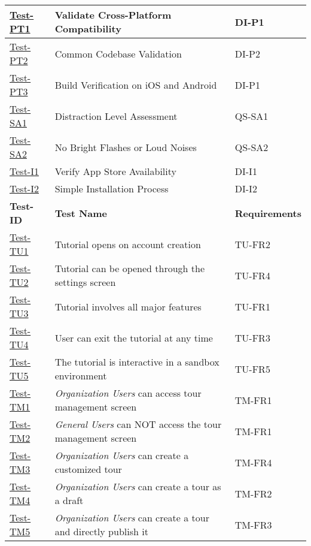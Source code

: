 \documentclass[12pt, titlepage]{article}
\begin{document}
\begin{table}[h!]
\begin{tabular}{|l|l|l|}
        \hline
        \hyperref[itm:Test-PT1]{Test-PT1} & Validate Cross-Platform Compatibility & DI-P1 \\
        \hline
        \hyperref[itm:Test-PT2]{Test-PT2} & Common Codebase Validation & DI-P2 \\
        \hline
        \hyperref[itm:Test-PT3]{Test-PT3} & Build Verification on iOS and Android & DI-P1\\
        \hline
        \hyperref[itm:Test-SA1]{Test-SA1} & Distraction Level Assessment & QS-SA1 \\
        \hline
        \hyperref[itm:Test-SA2]{Test-SA2} & No Bright Flashes or Loud Noises & QS-SA2 \\
        \hline
        \hyperref[itm:Test-I1]{Test-I1} & Verify App Store Availability & DI-I1 \\
        \hline
        \hyperref[itm:Test-I2]{Test-I2} & Simple Installation Process & DI-I2 \\
        \hline
        \textbf{Test-ID} & \textbf{Test Name} &\textbf{Requirements} \\
        \hline
        \hyperref[itm:Test-TU1]{Test-TU1} & Tutorial opens on account creation & TU-FR2 \\
        \hline
        \hyperref[itm:Test-TU2]{Test-TU2} & Tutorial can be opened through the settings screen & TU-FR4 \\
        \hline
        \hyperref[itm:Test-TU3]{Test-TU3} & Tutorial involves all major features & TU-FR1 \\
        \hline
        \hyperref[itm:Test-TU4]{Test-TU4} & User can exit the tutorial at any time & TU-FR3 \\
        \hline
        \hyperref[itm:Test-TU5]{Test-TU5} & The tutorial is interactive in a sandbox environment & TU-FR5 \\
        \hline
        \hyperref[itm:Test-TM1]{Test-TM1} & \textit{Organization Users} can access tour management screen & TM-FR1 \\
        \hline
        \hyperref[itm:Test-TM2]{Test-TM2} & \textit{General Users} can NOT access the tour management screen & TM-FR1 \\
        \hline
        \hyperref[itm:Test-TM3]{Test-TM3} & \textit{Organization Users} can create a customized tour & TM-FR4 \\
        \hline
        \hyperref[itm:Test-TM4]{Test-TM4} & \textit{Organization Users} can create a tour as a draft & TM-FR2 \\
        \hline
        \hyperref[itm:Test-TM5]{Test-TM5} & \textit{Organization Users} can create a tour and directly publish it & TM-FR3 \\

\end{tabular}
\end{table}
\end{document}
